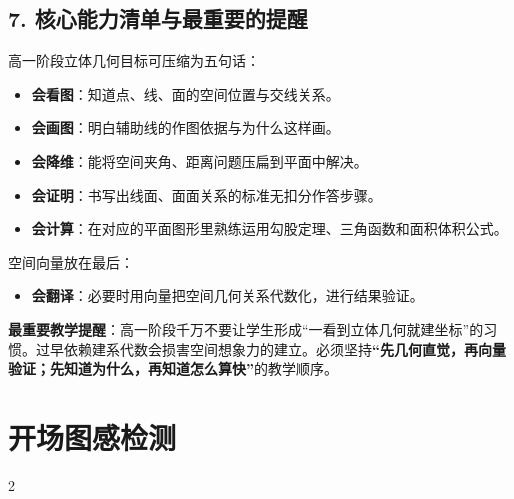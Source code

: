 \documentclass[11pt,a4paper]{ctexart}
\begin{document}
\subsection*{7. 核心能力清单与最重要的提醒}
高一阶段立体几何目标可压缩为五句话：
\begin{itemize}
  \item \textbf{会看图}：知道点、线、面的空间位置与交线关系。
  \item \textbf{会画图}：明白辅助线的作图依据与为什么这样画。
  \item \textbf{会降维}：能将空间夹角、距离问题压扁到平面中解决。
  \item \textbf{会证明}：书写出线面、面面关系的标准无扣分作答步骤。
  \item \textbf{会计算}：在对应的平面图形里熟练运用勾股定理、三角函数和面积体积公式。
\end{itemize}
空间向量放在最后：
\begin{itemize}
  \item \textbf{会翻译}：必要时用向量把空间几何关系代数化，进行结果验证。
\end{itemize}
\textbf{最重要教学提醒}：高一阶段千万不要让学生形成“一看到立体几何就建坐标”的习惯。过早依赖建系代数会损害空间想象力的建立。必须坚持\textbf{“先几何直觉，再向量验证；先知道为什么，再知道怎么算快”}的教学顺序。

\section{开场图感检测}

{\small \qSolidOpeningCubeRelationsStem}

\begin{paracol}{2}
\switchcolumn
{}
\end{paracol}

\par\vspace{1.0em}\par\vspace{1.0em}

{\small \qSolidOpeningPyramidProjectionStem}
\end{document}
